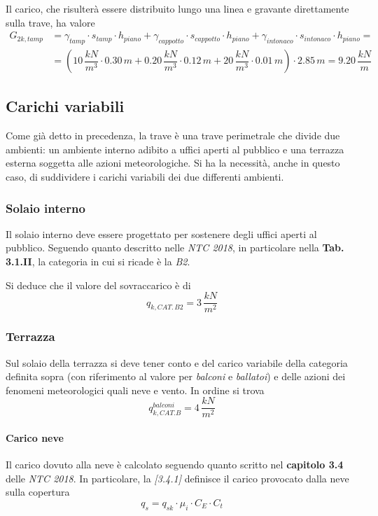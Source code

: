 Il carico, che risulterà essere distribuito lungo una linea e gravante direttamente sulla trave, ha valore
\begin{align*}
 G_{2k, tamp} &= \gamma_{tamp} \cdot s_{tamp} \cdot h_{piano} + \gamma_{cappotto} \cdot s_{cappotto} \cdot h_{piano} + \gamma_{intonaco} \cdot s_{intonaco} \cdot h_{piano} =\\
 &= \left(10\,\dfrac{kN}{m^3}\cdot 0.30\,\si{m} + 0.20\,\dfrac{kN}{m^3}\cdot 0.12\,\si{m} + 20\,\dfrac{kN}{m^3}\cdot 0.01\,\si{m}\right)\cdot 2.85\,\si{m} = 9.20\,\dfrac{kN}{m}
\end{align*}


\subsection{Carichi variabili}
Come già detto in precedenza, la trave è una trave perimetrale che divide due ambienti: un ambiente interno adibito a uffici aperti al pubblico e una terrazza esterna soggetta alle azioni meteorologiche. Si ha la necessità, anche in questo caso, di suddividere i carichi variabili dei due differenti ambienti.

\subsubsection*{Solaio interno}
Il solaio interno deve essere progettato per sostenere degli uffici aperti al pubblico. Seguendo quanto descritto nelle \emph{NTC 2018}, in particolare nella \textbf{Tab. 3.1.II}, la categoria in cui si ricade è la \emph{B2}. 

Si deduce che il valore del sovraccarico è di 
\[
 q_{k, CAT.\,B2} = 3\,\dfrac{kN}{m^2}
\]

\subsubsection*{Terrazza}
Sul solaio della terrazza si deve tener conto e del carico variabile della categoria definita sopra (con riferimento al valore per \emph{balconi} e \emph{ballatoi}) e delle azioni dei fenomeni meteorologici quali neve e vento. In ordine si trova
\[
 q_{k, CAT.B}^{balconi} = 4\,\dfrac{kN}{m^2}
\]

\paragraph{Carico neve}

Il carico dovuto alla neve è calcolato seguendo quanto scritto nel \textbf{capitolo 3.4} delle \emph{NTC 2018}. In particolare, la \emph{[3.4.1]} definisce il carico provocato dalla neve sulla copertura
\[
 q_s = q_{sk}\cdot \mu_i \cdot C_E \cdot C_t
\]

